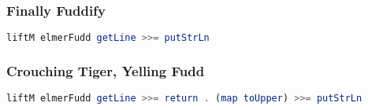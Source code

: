\documentclass[presentation.tex]{subfiles}
\begin{document}
\begin{frame}[fragile]
  \frametitle{Finally Fuddify}

  \begin{lstlisting}[frame=single,language=Haskell,breaklines=true]
    liftM elmerFudd getLine >>= putStrLn
  \end{lstlisting}
\end{frame}


\begin{frame}[fragile]
  \frametitle{Crouching Tiger, Yelling Fudd}

  \begin{lstlisting}[frame=single,language=Haskell,breaklines=true]
    liftM elmerFudd getLine >>= return . (map toUpper) >>= putStrLn
  \end{lstlisting}
\end{frame}
\end{document}
